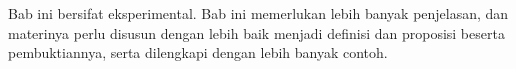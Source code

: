 \documentclass[../../../include/open-logic-chapter]{subfiles}
\begin{document}

\begin{editorial}
  Bab ini bersifat eksperimental. Bab ini memerlukan lebih banyak penjelasan,
  dan materinya perlu disusun dengan lebih baik menjadi definisi dan
  proposisi beserta pembuktiannya, serta dilengkapi dengan lebih banyak contoh.
\end{editorial}


\OLEndChapterHook
\end{document}
